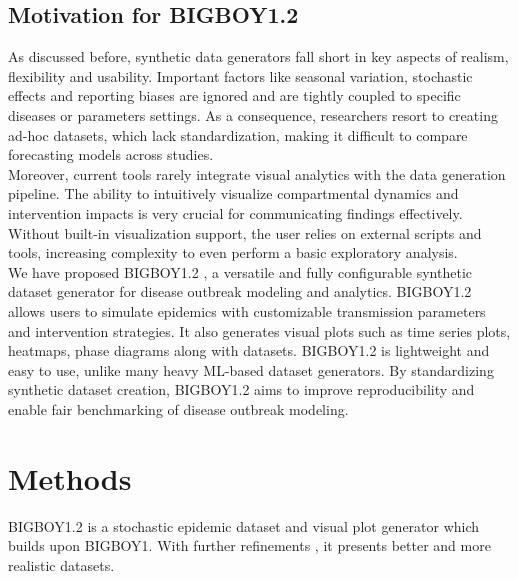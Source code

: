 \documentclass[11pt,a4paper]{article}
\theoremstyle{remark}\newtheorem{remark}{Remark}
\begin{document}
\subsection{Motivation for BIGBOY1.2}
As discussed before, synthetic data generators fall short in key aspects of realism, flexibility and usability. Important factors like seasonal variation, stochastic effects and reporting biases are ignored and are tightly coupled to specific diseases or parameters settings. As a consequence, researchers resort to creating ad-hoc datasets, which lack standardization, making it difficult to compare forecasting models across studies\cite{ray2020}. \\
Moreover, current tools rarely integrate visual analytics with the data generation pipeline. The ability to intuitively visualize compartmental dynamics and intervention impacts is very crucial for communicating findings effectively. Without built-in visualization support, the user relies on external scripts and tools, increasing complexity to even perform a basic exploratory analysis. \\
We have proposed BIGBOY1.2 , a versatile and fully configurable synthetic dataset generator for disease outbreak modeling and analytics. BIGBOY1.2 allows users to simulate epidemics with customizable transmission parameters and intervention strategies. It also generates visual plots such as time series plots, heatmaps, phase diagrams along with datasets. BIGBOY1.2 is lightweight and easy to use, unlike many heavy ML-based dataset generators. By standardizing synthetic dataset creation, BIGBOY1.2 aims to improve reproducibility and enable fair benchmarking of disease outbreak modeling.

\section{Methods}
BIGBOY1.2 is a stochastic epidemic dataset and visual plot generator which builds upon BIGBOY1. With further refinements , it presents better and more realistic datasets.
\end{document}
